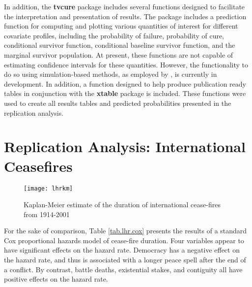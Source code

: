 \documentclass[letterpaper, 12pt]{article}
\theoremstyle{plain}
\begin{document}
In addition, the \textbf{tvcure} package includes several functions designed to facilitate the interpretation and presentation of results. The package includes a prediction function for computing and plotting various quantities of interest for different covariate profiles, including the probability of failure, probability of cure, conditional survivor function, conditional baseline survivor function, and the marginal survivor population. At present, these functions are not capable of estimating confidence intervals for these quantities. However, the functionality to do so using simulation-based methods, as employed by \citet{beger2017}, is currently in development. In addition, a function designed to help produce publication ready tables in conjunction with the \textbf{xtable} package is included. These functions were used to create all results tables and predicted probabilities presented in the replication analysis.


\section{Replication Analysis: International Ceasefires}

\begin{comment} %
Model 1 is baseline.
Model 2 is model 1 with Puppet FIRC instead of FIRC
Model 3 is baseline with Werner coding instead of Archicgos coding)
Model 4 is model 1 with agreement stength post-45 instead of normal
Model 5 is model 1 with a bunch of disaggregated agreement measures added - CBMs are signigicant
Model 6 restricts the analysis to CBMs
Model 7 uses a log-logistic specification
\end{comment}



\begin{figure}[htbp]\centering
	\caption{Kaplan-Meier estimate of the duration of international cease-fires from 1914-2001}
	\texttt{[image: lhrkm]}
	\label{fig:lhr_km}
\end{figure}

For the sake of comparison, Table \ref{tab.lhr.cox} presents the results of a standard Cox proportional hazards model of cease-fire duration. Four variables appear to have significant effects on the hazard rate. Democracy has a negative effect on the hazard rate, and thus is associated with a longer peace spell after the end of a conflict. By contrast, battle deaths, existential stakes, and contiguity all have positive effects on the hazard rate.
\end{document}
